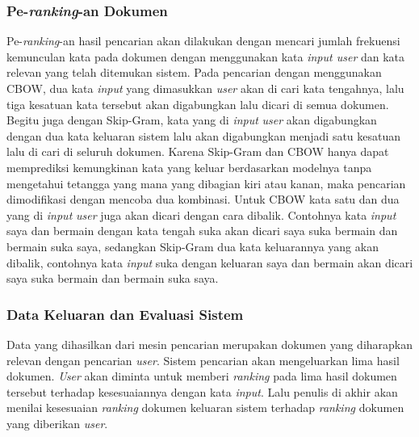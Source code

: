 \documentclass[12pt]{report}
\begin{document}
\subsubsection{Pe-\textit{ranking}-an Dokumen}
Pe-\textit{ranking}-an hasil pencarian akan dilakukan dengan mencari jumlah frekuensi kemunculan kata pada dokumen dengan menggunakan kata \textit{input user} dan kata relevan yang telah ditemukan sistem. Pada pencarian dengan menggunakan CBOW, dua kata \textit{input} yang dimasukkan \textit{user} akan di cari kata tengahnya, lalu tiga kesatuan kata tersebut akan digabungkan lalu dicari di semua dokumen. Begitu juga dengan Skip-Gram, kata yang di \textit{input} \textit{user} akan digabungkan dengan dua kata keluaran sistem lalu akan digabungkan menjadi satu kesatuan lalu di cari di seluruh dokumen. Karena Skip-Gram dan CBOW hanya dapat memprediksi kemungkinan kata yang keluar berdasarkan modelnya tanpa mengetahui tetangga yang mana yang dibagian kiri atau kanan, maka pencarian dimodifikasi dengan mencoba dua kombinasi. Untuk CBOW kata satu dan dua yang di \textit{input} \textit{user} juga akan dicari dengan cara dibalik. Contohnya kata \textit{input} saya dan bermain dengan kata tengah suka akan dicari saya suka bermain dan bermain suka saya, sedangkan Skip-Gram dua kata keluarannya yang akan dibalik, contohnya kata \textit{input} suka dengan keluaran saya dan bermain akan dicari saya suka bermain dan bermain suka saya.

\subsubsection{Data Keluaran dan Evaluasi Sistem}
Data yang dihasilkan dari mesin pencarian merupakan dokumen yang diharapkan relevan dengan pencarian \textit{user}. Sistem pencarian akan mengeluarkan lima hasil dokumen. \textit{User} akan diminta untuk memberi \textit{ranking} pada lima hasil dokumen tersebut terhadap kesesuaiannya dengan kata \textit{input}. Lalu penulis di akhir akan menilai kesesuaian \textit{ranking} dokumen keluaran sistem terhadap \textit{ranking} dokumen yang diberikan \textit{user}.

\end{document}
